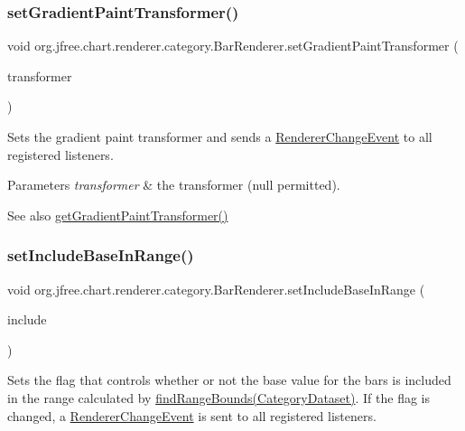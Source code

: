 \subsubsection{\texorpdfstring{set\+Gradient\+Paint\+Transformer()}{setGradientPaintTransformer()}}
{\footnotesize\ttfamily void org.\+jfree.\+chart.\+renderer.\+category.\+Bar\+Renderer.\+set\+Gradient\+Paint\+Transformer (\begin{DoxyParamCaption}\item[{Gradient\+Paint\+Transformer}]{transformer }\end{DoxyParamCaption})}

Sets the gradient paint transformer and sends a \mbox{\hyperlink{}{Renderer\+Change\+Event}} to all registered listeners.


\begin{DoxyParams}{Parameters}
{\em transformer} & the transformer ({\ttfamily null} permitted).\\
\hline
\end{DoxyParams}
\begin{DoxySeeAlso}{See also}
\mbox{\hyperlink{classorg_1_1jfree_1_1chart_1_1renderer_1_1category_1_1_bar_renderer_a4f1742f14bcdfcd92b36694668f85ee6}{get\+Gradient\+Paint\+Transformer()}} 
\end{DoxySeeAlso}
\mbox{\label{classorg_1_1jfree_1_1chart_1_1renderer_1_1category_1_1_bar_renderer_a98fdf75331a25f3c7a2197a3b1d0a055}} 
\subsubsection{\texorpdfstring{set\+Include\+Base\+In\+Range()}{setIncludeBaseInRange()}}
{\footnotesize\ttfamily void org.\+jfree.\+chart.\+renderer.\+category.\+Bar\+Renderer.\+set\+Include\+Base\+In\+Range (\begin{DoxyParamCaption}\item[{boolean}]{include }\end{DoxyParamCaption})}

Sets the flag that controls whether or not the base value for the bars is included in the range calculated by \mbox{\hyperlink{classorg_1_1jfree_1_1chart_1_1renderer_1_1category_1_1_abstract_category_item_renderer_aba6ace35854f96515fecf819b4fa20f7}{find\+Range\+Bounds(\+Category\+Dataset)}}. If the flag is changed, a \mbox{\hyperlink{}{Renderer\+Change\+Event}} is sent to all registered listeners.


